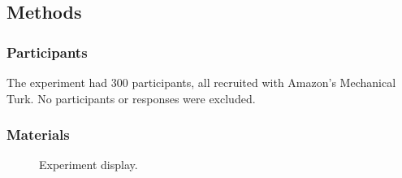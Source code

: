 \documentclass[leqno,12pt]{article}
\begin{document}

\subsection{Methods}

\subsubsection{Participants}

The experiment had 300 participants, all recruited with Amazon's
Mechanical Turk. No participants or responses were excluded.

\subsubsection{Materials}

\begin{figure}[t]
  \centering
  \caption{Experiment display.}
  \label{fig:exp1}
\end{figure}
\end{document}
